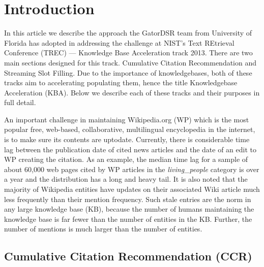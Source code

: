 
\section{Introduction}

In this article we describe the approach the GatorDSR team from 
University of Florida has adopted in addressing the challenge at NIST’s Text 
REtrieval Conference (TREC) --- Knowledge Base Acceleration track 2013. There are two main sections designed for this track. Cumulative Citation Recommendation and Streaming Slot Filling. Due to the importance of knowledgebases, both of these tracks aim to accelerating populating them, hence the title Knowledgebase Acceleration (KBA).
Below we describe each of these tracks and their purposes in full detail.

An important challenge in maintaining Wikipedia.org (WP) which is the most popular free, web-based, collaborative, multilingual encyclopedia in the internet, is to make sure its contents are uptodate. Currently, there is considerable time lag between the publication date of cited news articles and the date of an edit to WP creating the citation. As an example, the median time lag for a sample of about 60,000 web pages cited by WP articles in the \textit{living\_people} category is over a year and the distribution has a long and heavy tail\cite{JFrank12}. It is also noted that the majority of Wikipedia entities have updates on their associated Wiki article much less frequently than their mention frequency. Such stale entries are the norm in any large knowledge base (KB), because the number of humans maintaining the knowledge base is far fewer than the number of entities in the KB. Further, the number of mentions is much larger than the number of entities\cite{JFrank12}. 


\subsection{Cumulative Citation Recommendation (CCR)}

